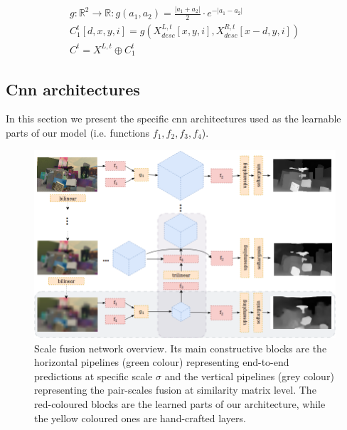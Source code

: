 \documentclass[10pt]{article}
\begin{document}
\begin{equation}
\begin{gathered} \label{eq:comparison_volume}
    g: \mathbb{R}^2 \rightarrow \mathbb{R}: g(a_1, a_2) = \frac{|a_1 + a_2|}{2} \cdot e^{-|a_1 - a_2|} \\
    C_1^t[d, x, y, i] = g( X^{L, t}_{desc}[x,y,i], X^{R, t}_{desc}[x-d,y, i]) \\
    C^t = X^{L, t} \oplus C_1^t
\end{gathered}
\end{equation}

\subsection{Cnn architectures}

In this section we present the specific cnn architectures used as the learnable parts of our model (i.e. functions $f_1, f_2, f_3, f_4$).

\begin{figure}
    \centering
    \includegraphics[width = \textwidth]{paper/latex/figures/cnn_architecture.png}
    \caption{Scale fusion network overview. Its main constructive blocks are the horizontal pipelines (green colour) representing end-to-end predictions at specific scale $\sigma$ and the vertical pipelines (grey colour) representing the pair-scales fusion at similarity matrix level. The red-coloured blocks are the learned parts of our architecture, while the yellow coloured ones are hand-crafted layers.}
    \label{fig:cnn_architecture}
\end{figure}
\end{document}
